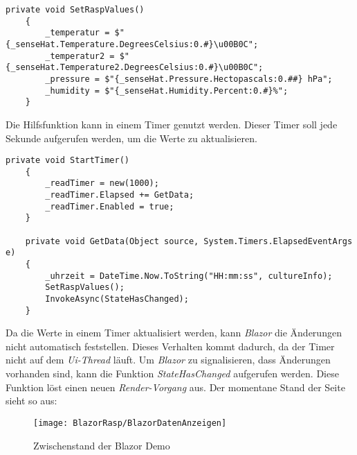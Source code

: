 \begin{lstlisting}[language={[Sharp]C}, caption=Funktion: SetRaspValues,
    label=lst:SetRaspValues]
    private void SetRaspValues()
    {
        _temperatur = $"{_senseHat.Temperature.DegreesCelsius:0.#}\u00B0C";
        _temperatur2 = $"{_senseHat.Temperature2.DegreesCelsius:0.#}\u00B0C";
        _pressure = $"{_senseHat.Pressure.Hectopascals:0.##} hPa";
        _humidity = $"{_senseHat.Humidity.Percent:0.#}%";
    }
\end{lstlisting}

Die Hilfsfunktion kann in einem Timer genutzt werden. Dieser Timer soll jede Sekunde
aufgerufen werden, um die Werte zu aktualisieren.

\begin{lstlisting}[language={[Sharp]C}, caption=Timer: _readTimer,
    label=lst:ReadTimer]
    private void StartTimer()
    {
        _readTimer = new(1000);
        _readTimer.Elapsed += GetData;
        _readTimer.Enabled = true;
    }

    private void GetData(Object source, System.Timers.ElapsedEventArgs e)
    {
        _uhrzeit = DateTime.Now.ToString("HH:mm:ss", cultureInfo);
        SetRaspValues();
        InvokeAsync(StateHasChanged);
    }
\end{lstlisting}

Da die Werte in einem Timer aktualisiert werden, kann \emph{Blazor} die Änderungen nicht
automatisch feststellen. Dieses Verhalten kommt dadurch, da der Timer nicht auf dem
\emph{Ui-Thread} läuft. Um \emph{Blazor} zu signalisieren, dass Änderungen
vorhanden sind, kann die Funktion \emph{StateHasChanged} aufgerufen werden. Diese
Funktion löst einen neuen \emph{Render-Vorgang} aus.
\newline
\newline
Der momentane Stand der Seite sieht so aus:

\begin{figure}[h]
    \centering
    \texttt{[image: BlazorRasp/BlazorDatenAnzeigen]}
    \caption[Zwischenstand der Blazor Demo]{Zwischenstand der Blazor Demo}
    \label{img:BlazorDatenAnzeigen}
\end{figure}